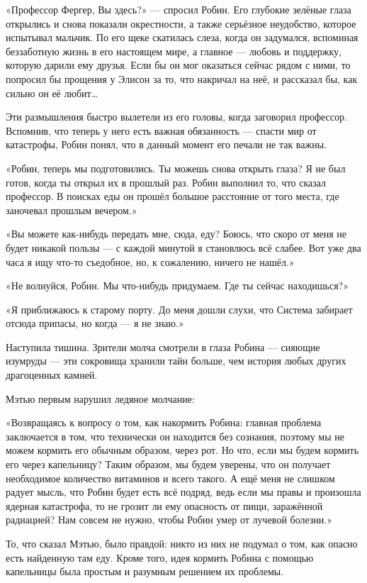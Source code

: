 \documentclass[a5paper, 9pt,
final, openany, twoside=true]{memoir}
\begin{document}
«Профессор Фергер, Вы здесь?» — спросил Робин. Его глубокие зелёные глаза открылись и снова показали окрестности, а также серьёзное неудобство, которое испытывал мальчик. По его щеке скатилась слеза, когда он задумался, вспоминая беззаботную жизнь в его настоящем мире, а главное — любовь и поддержку, которую дарили ему друзья. Если бы он мог оказаться сейчас рядом с ними, то попросил бы прощения у Элисон за то, что накричал на неё, и рассказал бы, как сильно он её любит…

Эти размышления быстро вылетели из его головы, когда заговорил профессор. Вспомнив, что теперь у него есть важная обязанность — спасти мир от катастрофы, Робин понял, что в данный момент его печали не так важны.

«Робин, теперь мы подготовились. Ты можешь снова открыть глаза? Я не был готов, когда ты открыл их в прошлый раз. Робин выполнил то, что сказал профессор. В поисках еды он прошёл большое расстояние от того места, где заночевал прошлым вечером.»

«Вы можете как-нибудь передать мне, сюда, еду? Боюсь, что скоро от меня не будет никакой пользы — с каждой минутой я становлюсь всё слабее. Вот уже два часа я ищу что-то съедобное, но, к сожалению, ничего не нашёл.»

«Не волнуйся, Робин. Мы что-нибудь придумаем. Где ты сейчас находишься?»

«Я приближаюсь к старому порту. До меня дошли слухи, что Система забирает отсюда припасы, но когда — я не знаю.»

Наступила тишина. Зрители молча смотрели в глаза Робина — сияющие изумруды — эти сокровища хранили тайн больше, чем история любых других драгоценных камней.

Мэтью первым нарушил ледяное молчание:

«Возвращаясь к вопросу о том, как накормить Робина: главная проблема заключается в том, что технически он находится без сознания, поэтому мы не можем кормить его обычным образом, через рот. Но что, если мы будем кормить его через капельницу? Таким образом, мы будем уверены, что он получает необходимое количество витаминов и всего такого. А ещё меня не слишком радует мысль, что Робин будет есть всё подряд, ведь если мы правы и произошла ядерная катастрофа, то не грозит ли ему опасность от пищи, заражённой радиацией? Нам совсем не нужно, чтобы Робин умер от лучевой болезни.»

То, что сказал Мэтью, было правдой: никто из них не подумал о том, как опасно есть найденную там еду. Кроме того, идея кормить Робина с помощью капельницы была простым и разумным решением их проблемы.
\end{document}
